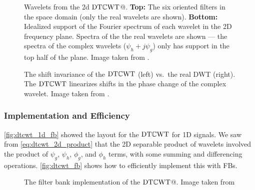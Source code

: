   \begin{figure}
    \centering
      \caption[Wavelets from the 2D \DTCWT]
              {Wavelets from the 2d $\DTCWT$@. \textbf{Top:} The six  oriented filters
      in the space domain (only the real wavelets are shown). \textbf{Bottom:}
      Idealized support of the Fourier spectrum of each wavelet in the 2D
      frequency plane. Spectra of the the real wavelets are shown --- the
      spectra of the complex wavelets ($\psi_h + j\psi_g$) only has support in the top
      half of the plane. Image taken from \citep{selesnick_dual-tree_2005}.}
      \label{fig:dtcwt_wavelets}
  \end{figure}
  \begin{figure}
    \centering
      \makebox[\textwidth][c]{%
      }
      \caption[The shift invariance ofthe $\DTCWT$ vs.\ the real DWT]
              {The shift invariance of the $\DTCWT$ (left) vs.\ the real DWT
              (right). The $\DTCWT$ linearizes shifts in the phase change of the complex
              wavelet. Image taken from \citep{kingsbury_dual-tree_1998}.}
      \label{fig:dtcwt_shift_invariance}
  \end{figure}

\subsubsection{Implementation and Efficiency}\label{sec:dtcwt_efficiency}
  \autoref{fig:dtcwt_1d_fb} showed the layout for the $\DTCWT$ for 1D signals. We
  saw from \autoref{eq:dtcwt_2d_product} that the 2D separable product of wavelets
  involved the product of $\psi_g$, $\psi_h$, $\phi_g$, and $\phi_h$ terms, with
  some summing and differencing operations. \autoref{fig:dtcwt_fb} shows how to
  efficiently implement this with FBs.
  
  \begin{figure}
    \centering
    \makebox[\textwidth][c]{%
    }
      \caption[The filter bank implementation of the \DTCWT]
              {The filter bank implementation of the $\DTCWT$@. Image taken from 
              \citep{kingsbury_image_1999}}
      \label{fig:dtcwt_fb}
  \end{figure}

